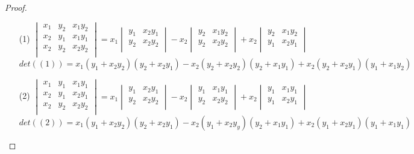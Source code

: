 \documentclass[12pt]{article}
\begin{document}
\begin{proof}
\begin{itemize}
\item[(1)] $\begin{vmatrix}
x_1 & y_2 & x_1y_2 \\
x_2 & y_1 & x_1y_1 \\
x_2 & y_2 & x_2y_2 \\
\end{vmatrix} = x_1\begin{vmatrix}
y_1 & x_2y_1 \\
y_2 & x_2y_2\\
\end{vmatrix} - x_2\begin{vmatrix}
y_2 & x_1y_2 \\
y_2 & x_2y_2 \\
\end{vmatrix} + x_2\begin{vmatrix}
y_2 & x_1y_2 \\
y_1 & x_2y_1 \\
\end{vmatrix}$\\
$det((1))= x_1(y_1 + x_2y_2)(y_2 + x_2y_1) - x_2(y_2 + x_2y_2)(y_2 + x_1y_1) + x_2(y_2 + x_2y_1)(y_1 + x_1y_2)$

\item[(2)] $\begin{vmatrix}
x_1 & y_1 & x_1y_1 \\
x_2 & y_1 & x_2y_1 \\
x_2 & y_2 & x_2y_2 \\
\end{vmatrix} = x_1\begin{vmatrix}
y_1 & x_2y_1 \\
y_2 & x_2y_2 \\
\end{vmatrix} - x_2\begin{vmatrix}
y_1 & x_1y_1 \\
y_2 & x_2y_2 \\
\end{vmatrix} + x_2\begin{vmatrix}
y_1 & x_1y_1 \\
y_1 & x_2y_1 \\
\end{vmatrix}$\\
$det((2)) = x_1(y_1+x_2y_2)(y_2+x_2y_1) - x_2(y_1+x_2y_y)(y_2+x_1y_1) + x_2(y_1+x_2y_1)(y_1+x_1y_1)$



\end{itemize}
\end{proof}
\end{document}
